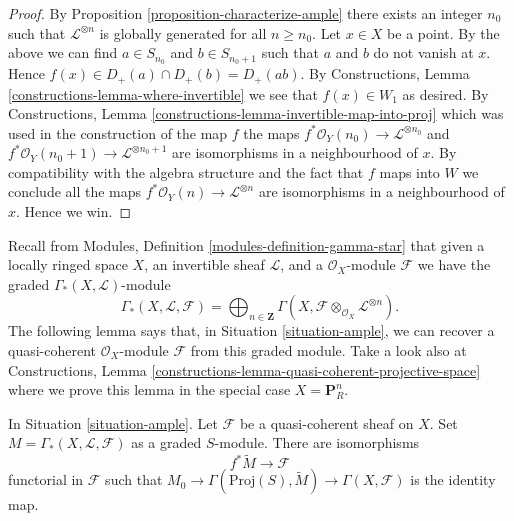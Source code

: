\begin{proof}
By Proposition \ref{proposition-characterize-ample} there exists an integer
$n_0$ such that $\mathcal{L}^{\otimes n}$ is globally generated for all
$n \geq n_0$. Let $x \in X$ be a point. By the above we can find
$a \in S_{n_0}$ and $b \in S_{n_0 + 1}$ such that
$a$ and $b$ do not vanish at $x$. Hence
$f(x) \in D_{+}(a) \cap D_{+}(b) = D_{+}(ab)$. By
Constructions, Lemma \ref{constructions-lemma-where-invertible}
we see that $f(x) \in W_1$ as desired. By
Constructions, Lemma \ref{constructions-lemma-invertible-map-into-proj}
which was used in the construction of the map $f$
the maps
$f^*\mathcal{O}_Y(n_0) \to \mathcal{L}^{\otimes n_0}$ and
$f^*\mathcal{O}_Y(n_0 + 1) \to \mathcal{L}^{\otimes n_0 + 1}$
are isomorphisms in a neighbourhood of $x$. By compatibility with
the algebra structure and the fact that $f$ maps into $W$
we conclude all the maps
$f^*\mathcal{O}_Y(n) \to \mathcal{L}^{\otimes n}$ are isomorphisms
in a neighbourhood of $x$. Hence we win.
\end{proof}

\noindent
Recall from Modules, Definition \ref{modules-definition-gamma-star}
that given a locally ringed space $X$, an invertible sheaf $\mathcal{L}$,
and a $\mathcal{O}_X$-module $\mathcal{F}$ we have the graded
$\Gamma_*(X, \mathcal{L})$-module
$$
\Gamma_*(X, \mathcal{L}, \mathcal{F}) =
\bigoplus\nolimits_{n \in \mathbf{Z}}
\Gamma(X, \mathcal{F} \otimes_{\mathcal{O}_X} \mathcal{L}^{\otimes n}).
$$
The following lemma says that, in Situation \ref{situation-ample},
we can recover a quasi-coherent $\mathcal{O}_X$-module $\mathcal{F}$
from this graded module. Take a look also at
Constructions, Lemma \ref{constructions-lemma-quasi-coherent-projective-space}
where we prove this lemma in the special case $X = \mathbf{P}^n_R$.

\begin{lemma}
\label{lemma-ample-quasi-coherent}
In Situation \ref{situation-ample}.
Let $\mathcal{F}$ be a quasi-coherent sheaf on $X$.
Set $M = \Gamma_*(X, \mathcal{L}, \mathcal{F})$ as a graded $S$-module.
There are isomorphisms
$$
f^*\widetilde{M} \longrightarrow \mathcal{F}
$$
functorial in $\mathcal{F}$ such that
$M_0 \to \Gamma(\text{Proj}(S), \widetilde{M}) \to \Gamma(X, \mathcal{F})$
is the identity map.
\end{lemma}

